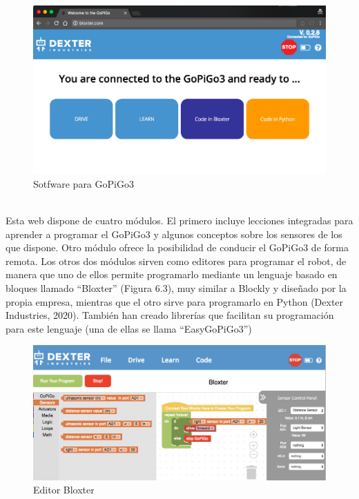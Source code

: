 \documentclass{report}
\begin{document}
\\
\begin{figure}[h!]
  \centering
    \includegraphics[width=1\textwidth]{images/software_GoPiGo.png}
  \caption{Sotfware para GoPiGo3}
  \label{Sotfware para GoPiGo3}
\end{figure}
\\
Esta web dispone de cuatro módulos. El primero incluye lecciones integradas para aprender a programar el GoPiGo3 y algunos conceptos sobre los sensores de los que dispone. Otro módulo ofrece la posibilidad de conducir el GoPiGo3 de forma remota. Los otros dos módulos sirven como editores para programar el robot, de manera que uno de ellos permite programarlo mediante un lenguaje basado en bloques llamado “Bloxter” (Figura 6.3), muy similar a Blockly y diseñado por la propia empresa, mientras que el otro sirve para programarlo en Python (Dexter Industries, 2020). También han creado librerías que facilitan su programación para este lenguaje (una de ellas se llama “EasyGoPiGo3”)
\\
\begin{figure}[h!]
  \centering
    \includegraphics[width=1\textwidth]{images/editor_bloxter.png}
  \caption{Editor Bloxter}
  \label{Editor Bloxter}
\end{figure}
\end{document}
